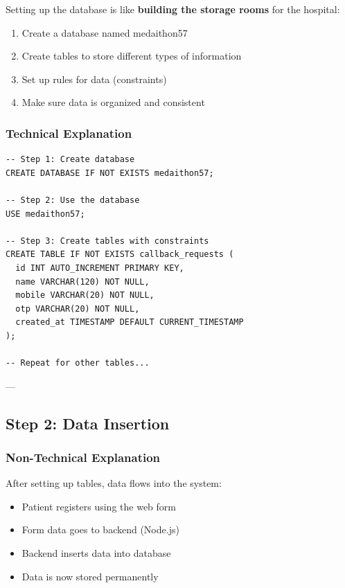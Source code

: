\documentclass[12pt,a4paper]{article}
\begin{document}
Setting up the database is like \textbf{building the storage rooms} for the hospital:

\begin{tcolorbox}[colback=green!10,colframe=green!50!black,title=Setup Process]
\begin{enumerate}
    \item Create a database named medaithon57
    \item Create tables to store different types of information
    \item Set up rules for data (constraints)
    \item Make sure data is organized and consistent
\end{enumerate}
\end{tcolorbox}

\subsubsection{Technical Explanation}

\begin{lstlisting}[caption={Database Setup (Your Work!)}]
-- Step 1: Create database
CREATE DATABASE IF NOT EXISTS medaithon57;

-- Step 2: Use the database
USE medaithon57;

-- Step 3: Create tables with constraints
CREATE TABLE IF NOT EXISTS callback_requests (
  id INT AUTO_INCREMENT PRIMARY KEY,
  name VARCHAR(120) NOT NULL,
  mobile VARCHAR(20) NOT NULL,
  otp VARCHAR(20) NOT NULL,
  created_at TIMESTAMP DEFAULT CURRENT_TIMESTAMP
);

-- Repeat for other tables...
\end{lstlisting}

---

\subsection{Step 2: Data Insertion}

\subsubsection{Non-Technical Explanation}

After setting up tables, data flows into the system:

\begin{itemize}
    \item Patient registers using the web form
    \item Form data goes to backend (Node.js)
    \item Backend inserts data into database
    \item Data is now stored permanently
\end{itemize}
\end{document}
